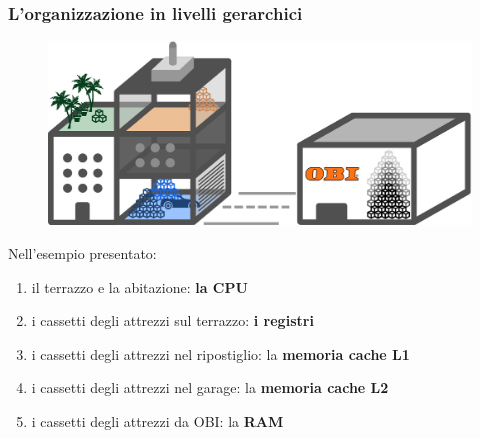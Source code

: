 \begin{frame}
	\frametitle{L'organizzazione in livelli gerarchici}
	
	\begin{figure}[!htbp] 
		\centering
		\includegraphics[width=0.6\linewidth]{images/5_memory/gardening.pdf}
	\end{figure}
	 \pause
	 Nell'esempio presentato: \pause
	 \begin{enumerate}
	 	\item il terrazzo e la abitazione: \pause \textbf{la CPU} \pause
	 	\item i cassetti degli attrezzi sul terrazzo: \pause \textbf{i registri} \pause
	 	\item i cassetti degli attrezzi nel ripostiglio: \pause la \textbf{memoria cache L1} \pause
	 	\item i cassetti degli attrezzi nel garage: \pause la \textbf{memoria cache L2} \pause
	 	\item i cassetti degli attrezzi da OBI: \pause la \textbf{RAM}
	 \end{enumerate}
	
\end{frame}


